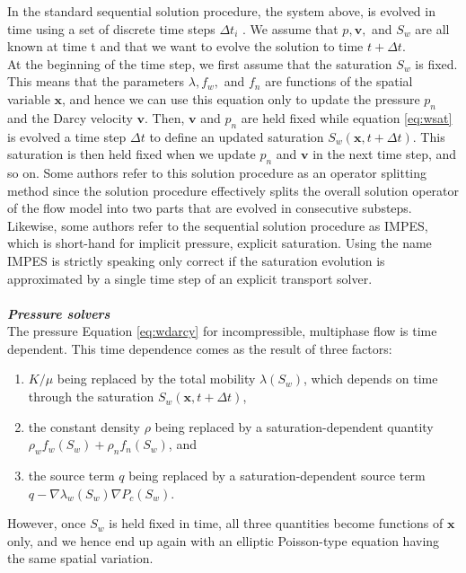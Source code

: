 \documentclass[a4paper,10pt]{report}
\begin{document}
In the standard sequential solution procedure, the system above, is
evolved in time using a set of discrete time steps $\Delta t_i$ . We assume that $p, \mathbf{v},$
and $S_w$ are all known at time t and that we want to evolve the solution to time
$t + \Delta t$.\\
At the beginning of the time step, we first assume that the saturation
$S_w$ is fixed. This means that the parameters $\lambda, f_w ,$ and $f_n$ are 
functions of the spatial variable $\mathbf{x}$, and hence we can use this equation only to update the pressure $p_n$ and the Darcy velocity $\mathbf{v}$. Then, $\mathbf{v}$ and $p_n$ are held
fixed while equation \ref{eq:wsat} is evolved a time step $\Delta t$ to define an updated saturation $S_w (\mathbf{x}, t + \Delta t)$. This saturation is then held fixed when we update $p_n$ and $\mathbf{v}$ in the next time step, and so on.
Some authors refer to this solution procedure as an operator splitting
method since the solution procedure effectively splits the overall solution operator of the flow model into two parts that are evolved in consecutive substeps.
Likewise, some authors refer to the sequential solution procedure as IMPES,
which is short-hand for implicit pressure, explicit saturation. Using the name
IMPES is strictly speaking only correct if the saturation evolution is approximated by a single time step of an explicit transport solver.\\\\
\emph{\textbf{Pressure solvers}}\\
The pressure Equation \eqref{eq:wdarcy} for incompressible, multiphase flow is time dependent. This time dependence comes as the result of three factors:
\begin{enumerate}
 \item $K/\mu$ being replaced by the total mobility $\lambda(S_w )$, which depends on time through the saturation $S_w (\mathbf{x}, t + \Delta t)$,
 \item the constant density $\rho$ being replaced by a saturation-dependent quantity $\rho_w f_w (S_w ) + \rho_nf_n (S_w )$, and
 \item the source term $q$ being replaced by a saturation-dependent source term
$q − \nabla \lambda_w (S_w )\nabla P_c (S_w )$.
\end{enumerate}
However, once $S_w$ is held fixed in time, all three quantities become functions of $\mathbf{x}$ only, and we hence end up again with an elliptic Poisson-type equation having the same spatial variation. \\
\end{document}
